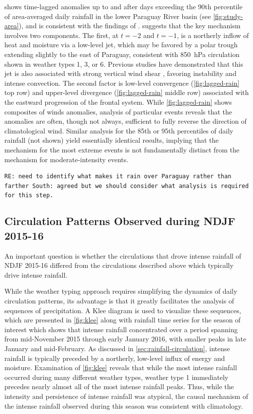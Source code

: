\documentclass[twocol]{ametsoc}
\begin{document}
 shows time-lagged anomalies up to and after days exceeding the 90th percentile of area-averaged daily rainfall in the lower Paraguay River basin (see \cref{fig:study-area}), and is consistent with the findings of \citet{Marengo2004,Salio:2007gd}.
 suggests that the key mechanism involves two components.
The first, at $t=-2$ and $t=-1$, is a northerly inflow of heat and moisture via a low-level jet, which may be favored by a polar trough extending slightly to the east of Paraguay, consistent with \SI{850}{\hecto\pascal} circulation shown in weather types 1, 3, or 6.
Previous studies have demonstrated that this jet is also associated with strong vertical wind shear \citep{Marengo2004,Silva2009}, favoring instability and intense convection.
The second factor is low-level convergence (\cref{fig:lagged-rain} top row) and upper-level divergence (\cref{fig:lagged-rain} middle row) associated with the eastward progression of the frontal system.
While \cref{fig:lagged-rain} shows composites of winds anomalies, analysis of particular events reveals that the anomalies are often, though not always, sufficient to fully reverse the direction of climatological wind.
Similar analysis for the 85th or 95th percentiles of daily rainfall (not shown) yield essentially identical results, implying that the mechanism for the most extreme events is not fundamentally distinct from the mechanism for moderate-intensity events.

\texttt{RE: need to identify what makes it rain over Paraguay rather than farther South: agreed but we should consider what analysis is required for this step.}

\subsection{Circulation Patterns Observed during NDJF 2015-16}

An important question is whether the circulations that drove intense rainfall of NDJF 2015-16 differed from the circulations described above which typically drive intense rainfall.

While the weather typing approach requires simplifying the dynamics of daily circulation patterns, its advantage is that it greatly facilitates the analysis of sequences of precipitation.
A Klee diagram \citep{Munoz2015, Munoz2016} is used to visualize these sequences, which are presented in \cref{fig:klee} along with rainfall time series for the season of interest which shows that intense rainfall concentrated over a period spanning from mid-November 2015 through early January 2016, with smaller peaks in late January and mid-February.
As discussed in \cref{sec:rainfall-circulation}, intense rainfall is typically preceded by a northerly, low-level influx of energy and moisture.
Examination of \cref{fig:klee} reveals that while the most intense rainfall occurred during many different weather types, weather type 1 immediately precedes nearly almost all of the most intense rainfall peaks.
Thus, while the intensity and persistence of intense rainfall was atypical, the causal mechanism of the intense rainfall observed during this season was consistent with climatology.
\end{document}
